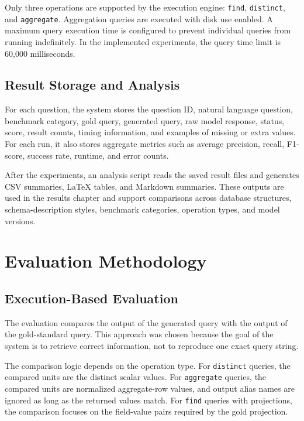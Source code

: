 Only three operations are supported by the execution engine: \texttt{find}, \texttt{distinct}, and \texttt{aggregate}. Aggregation queries are executed with disk use enabled. A maximum query execution time is configured to prevent individual queries from running indefinitely. In the implemented experiments, the query time limit is 60,000 milliseconds.

\subsection{Result Storage and Analysis}

For each question, the system stores the question ID, natural language question, benchmark category, gold query, generated query, raw model response, status, score, result counts, timing information, and examples of missing or extra values. For each run, it also stores aggregate metrics such as average precision, recall, F1-score, success rate, runtime, and error counts.

After the experiments, an analysis script reads the saved result files and generates CSV summaries, LaTeX tables, and Markdown summaries. These outputs are used in the results chapter and support comparisons across database structures, schema-description styles, benchmark categories, operation types, and model versions.

\section{Evaluation Methodology}

\subsection{Execution-Based Evaluation}

The evaluation compares the output of the generated query with the output of the gold-standard query. This approach was chosen because the goal of the system is to retrieve correct information, not to reproduce one exact query string.

The comparison logic depends on the operation type. For \texttt{distinct} queries, the compared units are the distinct scalar values. For \texttt{aggregate} queries, the compared units are normalized aggregate-row values, and output alias names are ignored as long as the returned values match. For \texttt{find} queries with projections, the comparison focuses on the field-value pairs required by the gold projection.

